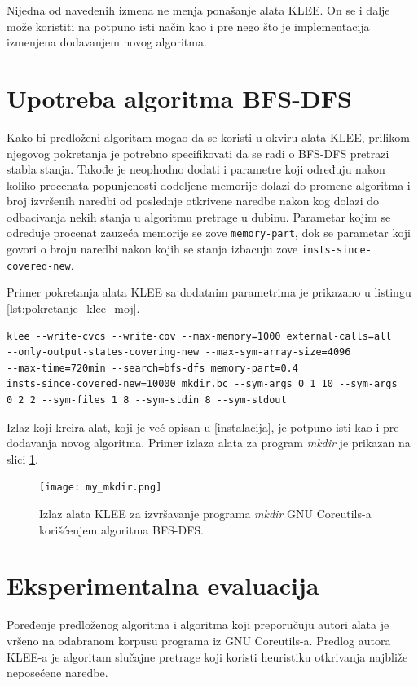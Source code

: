 \documentclass[12pt,oneside]{memoir}
\begin{document}
Nijedna od navedenih izmena ne menja ponašanje alata KLEE. On se i dalje može koristiti na potpuno isti način kao i pre nego što je implementacija izmenjena dodavanjem novog algoritma.

\section{Upotreba algoritma BFS-DFS}

Kako bi predloženi algoritam mogao da se koristi u okviru alata KLEE, prilikom njegovog pokretanja je potrebno specifikovati da se radi o BFS-DFS pretrazi stabla stanja. Takođe je neophodno dodati i parametre koji određuju nakon koliko procenata popunjenosti dodeljene memorije dolazi do promene algoritma i broj izvršenih naredbi od poslednje otkrivene naredbe nakon kog dolazi do odbacivanja nekih stanja u algoritmu pretrage u dubinu. Parametar kojim se određuje procenat zauzeća memorije se zove \texttt{memory-part}, dok se parametar koji govori o broju naredbi nakon kojih se stanja izbacuju zove \texttt{insts-since-covered-new}. 

Primer pokretanja alata KLEE sa dodatnim parametrima je prikazano u listingu \ref{lst:pokretanje_klee_moj}.

\begin{lstlisting}[caption={Primer pokretanja alata KLEE gde se za pretragu stabla stanja koristi algoritam BFS-DFS.}, label={lst:pokretanje_klee_moj}, captionpos=b]
klee --write-cvcs --write-cov --max-memory=1000 external-calls=all
--only-output-states-covering-new --max-sym-array-size=4096 
--max-time=720min --search=bfs-dfs memory-part=0.4 
insts-since-covered-new=10000 mkdir.bc --sym-args 0 1 10 --sym-args 
0 2 2 --sym-files 1 8 --sym-stdin 8 --sym-stdout

\end{lstlisting}

Izlaz koji kreira alat, koji je već opisan u \ref{instalacija}, je potpuno isti kao i pre dodavanja novog algoritma. Primer izlaza alata za program \textit{mkdir} je prikazan na slici \ref{fig:my_mkdir}.

\begin{figure}[ht]
    \centering
    \texttt{[image: my\_mkdir.png]}
    \caption{Izlaz alata KLEE za izvršavanje programa \textit{mkdir} GNU Coreutils-a korišćenjem algoritma BFS-DFS.}
    \label{fig:my_mkdir}
\end{figure}

\section{Eksperimentalna evaluacija}
Poređenje predloženog algoritma i algoritma koji preporučuju autori alata je vršeno na odabranom korpusu programa iz GNU Coreutils-a. Predlog autora KLEE-a \cite{klee} je algoritam slučajne pretrage koji koristi heuristiku otkrivanja najbliže neposećene naredbe. 
\end{document}
